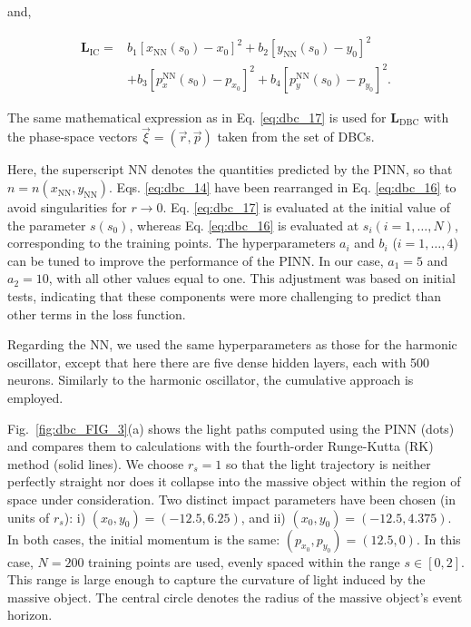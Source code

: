 and,

\begin{equation}\label{eq:dbc_17}
\begin{aligned}\mathbf{L}_{\mathrm{IC}}={}&b_1\left[x_{\mathrm{NN}}(s_0)-x_0\right]^2+b_2\left[y_{\mathrm{NN}}(s_0)-y_0\right]^2\\&+b_3\left[p_x^{\mathrm{NN}}(s_0)-p_{x_0}\right]^2+b_4\left[p_y^{\mathrm{NN}}(s_0)-p_{y_0}\right]^2.\end{aligned}
\end{equation}

The same mathematical expression as in Eq. \ref{eq:dbc_17} is used for $\mathbf{L}_{\mathrm{DBC}}$ with the phase-space vectors $\vec{\xi}=(\vec{r},\vec{p})$ taken from the set of DBCs.

Here, the superscript NN denotes the quantities predicted by the PINN, so that $n = n(x_{\mathrm{NN}} , y_{\mathrm{NN}} )$. Eqs. \ref{eq:dbc_14} have been rearranged in Eq. \ref{eq:dbc_16} to avoid singularities for $r \rightarrow 0$. Eq. \ref{eq:dbc_17} is evaluated at the initial value of the parameter $s (s_0 )$, whereas Eq. \ref{eq:dbc_16} is evaluated at $s_i (i = 1, \ldots , N)$, corresponding to the training points. The hyperparameters $a_i$ and $b_i$ ($i=1,\ldots,4$) can be tuned to improve the performance of the PINN. In our case, $a_1 = 5$ and $a_2 = 10$, with all other values equal to one. This adjustment was based on initial tests, indicating that these components were more challenging to predict than other terms in the loss function.

Regarding the NN, we used the same hyperparameters as those for the harmonic oscillator, except that here there are five dense hidden layers, each with 500 neurons. Similarly to the harmonic oscillator, the cumulative approach is employed.

Fig.~\ref{fig:dbc_FIG_3}(a) shows the light paths computed using the PINN (dots) and compares them to calculations with the fourth-order Runge-Kutta (RK) method (solid lines). We choose $r_s = 1$ so that the light trajectory is neither perfectly straight nor does it collapse into the massive object within the region of space under consideration. Two distinct impact parameters have been chosen (in units of $r_s$): i) $(x_0,y_0)=(-12.5,6.25)$, and ii) $(x_0,y_0)=(-12.5,4.375)$. In both cases, the initial momentum is the same: $(p_{x_0},p_{y_0})=(12.5,0)$. In this case, $N = 200$ training points are used, evenly spaced within the range $s \in [0, 2]$. This range is large enough to capture the curvature of light induced by the massive object. The central circle denotes the radius of the massive object's event horizon.

